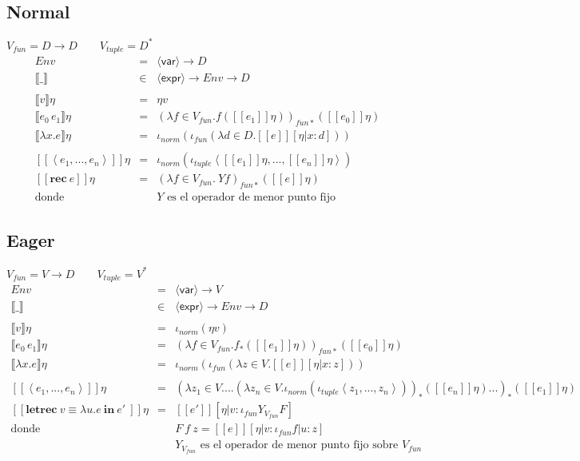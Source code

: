 \documentclass[12pt,a4paper]{article}
\newcommand{\PN}{\par\noindent}
\newcommand{\nonterminal}[1]{\langle \mathsf{#1} \rangle}
\newcommand{\expr}{\nonterminal{expr}}
\newcommand{\var}{\nonterminal{var}}
\newcommand{\Env}{\mathit{Env}}
\newcommand{\la}{\left\langle }
\newcommand{\ra}{\right\rangle }
\newcommand{\se}[1]{[\![#1]\!]}
\newcommand{\letrecin}[2]{\textbf{letrec}\ #1\ \textbf{in}\ #2\ }
\begin{document}
    \subsection{Normal}
      \PN $V_{fun} = D \rightarrow D \qquad V_{tuple} = D^{*}$
      \begin{eqnarray*}
        \Env &=& \var \to  D \\
        \llbracket\_\rrbracket &\in& \expr \to  Env \to  D \\ \\
        \llbracket v \rrbracket\eta &=& \eta v \\
        \llbracket e_0\, e_1\rrbracket\eta &=& (\lambda f \in V_{fun}. f(\se{e_1}\eta))_{fun*} (\se{e_0}\eta) \\
        \llbracket\lambda x.e\rrbracket\eta &=& \iota_{norm}(\iota_{fun}(\lambda d \in D. \se{e}[\eta|x:d])) \\ \\
        \se{\la e_1, ..., e_n \ra}\eta &=& \iota_{norm}(\iota_{tuple} \la \se{e_1}\eta, ..., \se{e_n}\eta \ra) \\
        \se{\textbf{rec}\  e} \eta &=& (\lambda f \in  V_{fun}.\ Y f)_{fun*} (\se{e}\eta ) \\
        \text{donde} && Y \text{ es el operador de menor punto fijo}
      \end{eqnarray*}
        
    \subsection{Eager}
      \PN $V_{fun} = V \rightarrow D \qquad V_{tuple} = V^{*}$
      \begin{eqnarray*}
        Env &=& \var \to V \\
        \llbracket\_\rrbracket &\in& \expr \to Env \to D \\ \\
        \llbracket v\rrbracket\eta &=& \iota_{norm}(\eta v) \\
        \llbracket e_0\, e_1\rrbracket\eta &=& (\lambda f \in V_{fun}. f_{*} (\se{e_1}\eta))_{fun*} (\se{e_0}\eta) \\
        \llbracket\lambda x.e\rrbracket\eta &=& \iota_{norm}(\iota_{fun}(\lambda z \in V. \se{e}[\eta|x:z])) \\ \\
        \se{\la e_1, ..., e_n \ra}\eta &=& (\lambda z_1 \in V. ... (\lambda z_n \in V . \iota_{norm}(\iota_{tuple} \la z_1, ..., z_n\ra))_{*} (\se{e_n}\eta) ...)_{*} (\se{e_1}\eta) \\
        \se{\letrecin{v \equiv \lambda u.e}{e'}}\eta &=& \se{e'} [\eta |v:\iota_{fun} Y_{V_{fun}} F] \\
        \text{donde} && F\ f\ z = \se{e}[\eta| v: \iota_{fun} f | u:z] \\
        && Y_{V_{fun}} \text{ es el operador de menor punto fijo sobre } V_{fun}
      \end{eqnarray*}
\end{document}
